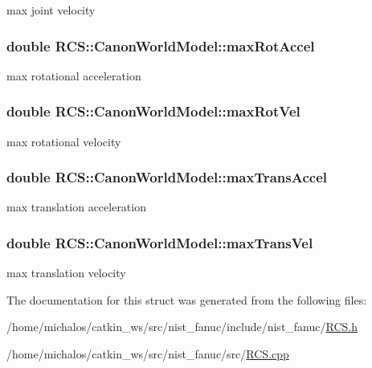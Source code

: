 max joint velocity \hypertarget{structRCS_1_1CanonWorldModel_aca5f8ebce128e94ed4edf3caabb6c363}{
\subsubsection[{max\-Rot\-Accel}]{\setlength{\rightskip}{0pt plus 5cm}double R\-C\-S\-::\-Canon\-World\-Model\-::max\-Rot\-Accel}}\label{structRCS_1_1CanonWorldModel_aca5f8ebce128e94ed4edf3caabb6c363}
max rotational acceleration \hypertarget{structRCS_1_1CanonWorldModel_acbb472eee22bb4764dc865476fe56950}{
\subsubsection[{max\-Rot\-Vel}]{\setlength{\rightskip}{0pt plus 5cm}double R\-C\-S\-::\-Canon\-World\-Model\-::max\-Rot\-Vel}}\label{structRCS_1_1CanonWorldModel_acbb472eee22bb4764dc865476fe56950}
max rotational velocity \hypertarget{structRCS_1_1CanonWorldModel_a9b6d5469341e73289788ba0fe0f3c57a}{
\subsubsection[{max\-Trans\-Accel}]{\setlength{\rightskip}{0pt plus 5cm}double R\-C\-S\-::\-Canon\-World\-Model\-::max\-Trans\-Accel}}\label{structRCS_1_1CanonWorldModel_a9b6d5469341e73289788ba0fe0f3c57a}
max translation acceleration \hypertarget{structRCS_1_1CanonWorldModel_a55824e72d1d92c8b5f5c8ecf3b7c7a00}{
\subsubsection[{max\-Trans\-Vel}]{\setlength{\rightskip}{0pt plus 5cm}double R\-C\-S\-::\-Canon\-World\-Model\-::max\-Trans\-Vel}}\label{structRCS_1_1CanonWorldModel_a55824e72d1d92c8b5f5c8ecf3b7c7a00}
max translation velocity 

The documentation for this struct was generated from the following files\-:\begin{DoxyCompactItemize}
\item 
/home/michalos/catkin\-\_\-ws/src/nist\-\_\-fanuc/include/nist\-\_\-fanuc/\hyperlink{RCS_8h}{R\-C\-S.\-h}\item 
/home/michalos/catkin\-\_\-ws/src/nist\-\_\-fanuc/src/\hyperlink{RCS_8cpp}{R\-C\-S.\-cpp}\end{DoxyCompactItemize}
